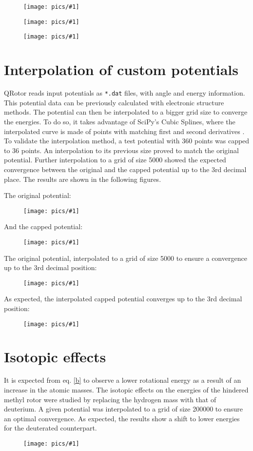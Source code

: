 \documentclass[12pt,a4paper]{article}
\newcommand{\NEWPICC}[2]{
\begin{figure}[H]
    \centering
    \texttt{[image: pics/\#1]}
    \label{#1}
    \end{figure}
    }
\begin{document}
\NEWPICC{titov2023_2.png}{0.85}
\NEWPICC{titov2023_op_2.png}{0.85}

\NEWPICC{convergence_E2_00004.png}{1}


\section*{Interpolation of custom potentials}

QRotor reads input potentials as \texttt{*.dat} files, with angle and energy information.
This potential data can be previously calculated with electronic structure methods. The potential can then be interpolated to a bigger grid size to converge the energies. To do so, it takes advantage of SciPy's Cubic Splines, where the interpolated curve is made of points with matching first and second derivatives \cite{cubicsplines}.\\

To validate the interpolation method, a test potential with 360 points was capped to 36 points. An interpolation to its previous size proved to match the original potential. Further interpolation to a grid of size 5000 showed the expected convergence between the original and the capped potential up to the 3rd decimal place. The results are shown in the following figures.

\newpage

The original potential:
\NEWPICC{potential_felix_360.png}{1}
And the capped potential:
\NEWPICC{potential_felix_36.png}{1}

\newpage

The original potential, interpolated to a grid of size 5000 to ensure a convergence up to the 3rd decimal position:
\NEWPICC{potential_felix_5000.png}{1}
As expected, the interpolated capped potential converges up to the 3rd decimal position:
\NEWPICC{potential_felix_5000-from-36.png}{1}


\section*{Isotopic effects}

It is expected from eq. \eqref{b} to observe a lower rotational energy as a result of an increase in the atomic masses. The isotopic effects on the energies of the hindered methyl rotor were studied by replacing the hydrogen mass with that of deuterium. A given potential was interpolated to a grid of size 200000 to ensure an optimal convergence. As expected, the results show a shift to lower energies for the deuterated counterpart.

\NEWPICC{potential_felix_HD.png}{1}


\end{document}
